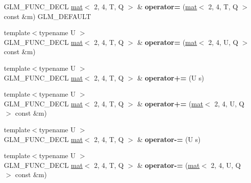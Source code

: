 \begin{DoxyCompactItemize}
\mbox{\label{structglm_1_1mat_3_012_00_014_00_01T_00_01Q_01_4_a8be53a3fec5b24c40693f8279a2a41b5}} 
G\+L\+M\+\_\+\+F\+U\+N\+C\+\_\+\+D\+E\+CL \hyperlink{structglm_1_1mat}{mat}$<$ 2, 4, T, Q $>$ \& {\bfseries operator=} (\hyperlink{structglm_1_1mat}{mat}$<$ 2, 4, T, Q $>$ const \&m) G\+L\+M\+\_\+\+D\+E\+F\+A\+U\+LT
\item 
\mbox{\label{structglm_1_1mat_3_012_00_014_00_01T_00_01Q_01_4_a66843b530032197e7b44a44c28314bc6}} 
{\footnotesize template$<$typename U $>$ }\\G\+L\+M\+\_\+\+F\+U\+N\+C\+\_\+\+D\+E\+CL \hyperlink{structglm_1_1mat}{mat}$<$ 2, 4, T, Q $>$ \& {\bfseries operator=} (\hyperlink{structglm_1_1mat}{mat}$<$ 2, 4, U, Q $>$ const \&m)
\item 
\mbox{\label{structglm_1_1mat_3_012_00_014_00_01T_00_01Q_01_4_a9db5a3048b0256fb313cdd6a41da96a1}} 
{\footnotesize template$<$typename U $>$ }\\G\+L\+M\+\_\+\+F\+U\+N\+C\+\_\+\+D\+E\+CL \hyperlink{structglm_1_1mat}{mat}$<$ 2, 4, T, Q $>$ \& {\bfseries operator+=} (U s)
\item 
\mbox{\label{structglm_1_1mat_3_012_00_014_00_01T_00_01Q_01_4_aa1d0289966cfba6918cdbdab0eb6d894}} 
{\footnotesize template$<$typename U $>$ }\\G\+L\+M\+\_\+\+F\+U\+N\+C\+\_\+\+D\+E\+CL \hyperlink{structglm_1_1mat}{mat}$<$ 2, 4, T, Q $>$ \& {\bfseries operator+=} (\hyperlink{structglm_1_1mat}{mat}$<$ 2, 4, U, Q $>$ const \&m)
\item 
\mbox{\label{structglm_1_1mat_3_012_00_014_00_01T_00_01Q_01_4_ac74de81b921e4090b67c3717d9144308}} 
{\footnotesize template$<$typename U $>$ }\\G\+L\+M\+\_\+\+F\+U\+N\+C\+\_\+\+D\+E\+CL \hyperlink{structglm_1_1mat}{mat}$<$ 2, 4, T, Q $>$ \& {\bfseries operator-\/=} (U s)
\item 
\mbox{\label{structglm_1_1mat_3_012_00_014_00_01T_00_01Q_01_4_a8000ab27bcdbf1041cdaaad2c71df7a3}} 
{\footnotesize template$<$typename U $>$ }\\G\+L\+M\+\_\+\+F\+U\+N\+C\+\_\+\+D\+E\+CL \hyperlink{structglm_1_1mat}{mat}$<$ 2, 4, T, Q $>$ \& {\bfseries operator-\/=} (\hyperlink{structglm_1_1mat}{mat}$<$ 2, 4, U, Q $>$ const \&m)

\end{DoxyCompactItemize}
